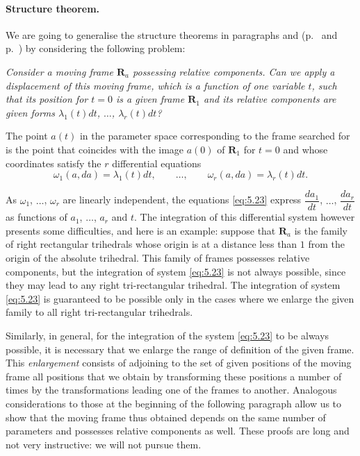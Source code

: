 \paragraph{Structure theorem.}
\label{sec:77}
We are going to generalise the structure theorems in paragraphs  and  (p.~\pageref{sec:7} and p.~\pageref{sec:26}) by considering the following problem:

\somespace

\emph{Consider a moving frame $\mathbf{R}_{a}$ possessing relative components. Can we apply a displacement of this moving frame, which is a function of one variable $t$, such that its position for $t=0$ is a given frame $\mathbf{R}_{1}$ and its relative components are given forms $\lambda_{1}(t)dt$, $\dots$, $\lambda_{r}(t)dt$?}

\somespace

The point $a(t)$ in the parameter space corresponding to the frame searched for is the point that coincides with the image $a(0)$ of $\mathbf{R}_{1}$ for $t=0$ and whose coordinates satisfy the $r$ differential equations
\begin{equation}
  \label{eq:5.23}
  \omega_{1}(a,da)=\lambda_{1}(t)dt,\qquad\dots,\qquad\omega_{r}(a,da)=\lambda_{r}(t)dt.
\end{equation}

As $\omega_{1}$, $\dots$, $\omega_{r}$ are linearly independent, the equations \eqref{eq:5.23} express $\dfrac{da_{1}}{dt}$, $\dots$, $\dfrac{da_{r}}{dt}$ as functions of $a_{1}$, $\dots$, $a_{r}$ and $t$. The integration of this differential system however presents some difficulties, and here is an example: suppose that $\mathbf{R}_{a}$ is the family of right rectangular trihedrals whose origin is at a distance less than $1$ from the origin of the absolute trihedral. This family of frames possesses relative components, but the integration of system \eqref{eq:5.23} is not always possible, since they may lead to any right tri-rectangular trihedral. The integration of system \eqref{eq:5.23} is guaranteed to be possible only in the cases where we enlarge the given family to all right tri-rectangular trihedrals.

Similarly, in general, for the integration of the system \eqref{eq:5.23} to be always possible, it is necessary that we enlarge the range of definition of the given frame. This \emph{enlargement} consists of adjoining to the set of given positions of the moving frame all positions that we obtain by transforming these positions a number of times by the transformations leading one of the frames to another. Analogous considerations to those at the beginning of the following paragraph allow us to show that the moving frame thus obtained depends on the same number of parameters and possesses relative components as well. These proofs are long and not very instructive: we will not pursue them.

